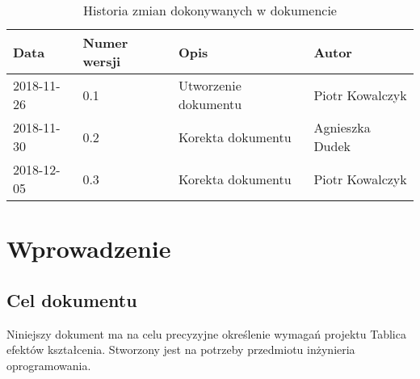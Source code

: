 \documentclass{article}
\begin{document}
\begin{titlepage}






\end{titlepage}

\addtocounter{page}{1}
\newpage

\begin{table}[h!]
	\begin{center}
		\caption{Historia zmian dokonywanych w dokumencie}
		\begin{tabular}{|l|l|l|l|}
			\hline
			Data & Numer wersji & Opis & Autor \\
			\hline \hline
			2018-11-26 & 0.1 & Utworzenie dokumentu & Piotr Kowalczyk \\
			\hline 
			2018-11-30 & 0.2 & Korekta dokumentu & Agnieszka Dudek \\
			\hline
			2018-12-05 & 0.3 & Korekta dokumentu & Piotr Kowalczyk \\
			\hline
    \end{tabular}
	\end{center}
\end{table}	

\tableofcontents

\newpage


\section{Wprowadzenie}

\subsection{Cel dokumentu}
Niniejszy dokument ma na celu precyzyjne określenie wymagań projektu Tablica efektów kształcenia.
Stworzony jest na potrzeby przedmiotu inżynieria oprogramowania.
\end{document}
